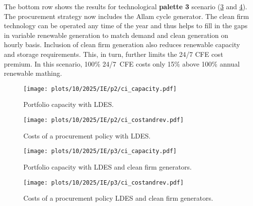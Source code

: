 The bottom row shows the results for technological \textbf{palette 3} scenario (\cref{fig:10-2025-IE-p3-ci_capacity} and \cref{fig:10-2025-IE-p3-ci_costandrev}). 
The procurement strategy now includes the Allam cycle generator.
The clean firm technology can be operated any time of the year and thus helps to fill in the gaps in variable renewable generation to match demand and clean generation on hourly basis.
Inclusion of clean firm generation also reduces renewable capacity and storage requirements. 
This, in turn, further limits the 24/7 CFE cost premium.
In this scenario, 100\% 24/7~CFE costs only 15\% above 100\% annual renewable mathing.

\begin{figure*}
    \centering
    \begin{subfigure}{0.5\textwidth}
        \centering
        \caption{Portfolio capacity with LDES.}
        \texttt{[image: plots/10/2025/IE/p2/ci\_capacity.pdf]}
        \label{fig:10-2025-IE-p2-ci_capacity}
    \end{subfigure}%
    \begin{subfigure}{0.5\textwidth}
        \centering
        \caption{Costs of a procurement policy with LDES.}
        \texttt{[image: plots/10/2025/IE/p2/ci\_costandrev.pdf]}
        \label{fig:10-2025-IE-p2-ci_costandrev}
    \end{subfigure}

    \begin{subfigure}{0.5\textwidth}
        \centering
        \vspace{-0.5cm}
        \caption{Portfolio capacity with LDES and clean firm generators.}
        \texttt{[image: plots/10/2025/IE/p3/ci\_capacity.pdf]}
        \label{fig:10-2025-IE-p3-ci_capacity}
    \end{subfigure}%
    \begin{subfigure}{0.5\textwidth}
        \centering
        \vspace{-0.5cm}
        \caption{Costs of a procurement policy LDES and clean firm generators.}
        \texttt{[image: plots/10/2025/IE/p3/ci\_costandrev.pdf]}
        \label{fig:10-2025-IE-p3-ci_costandrev}
    \end{subfigure}
    \caption{Procurement of clean resources and energy storage if \gls{ci} consumerts have an access to a wider palette of technologies. 
    The top row shows the power capacity portfolio (\cref{fig:10-2025-IE-p2-ci_capacity}) and the breakdown of costs (\cref{fig:10-2025-IE-p2-ci_costandrev}) 
    if \gls{ldes} is available on the market.
    The bottom row shows the power capacity portfolio (\cref{fig:10-2025-IE-p3-ci_capacity}) and the breakdown of costs (\cref{fig:10-2025-IE-p3-ci_costandrev}) 
    for a case when both \gls{ldes} and clean firm dispatchable generators are available.}
    \label{fig:10-2025-IE-p23-ci_procurement}
\end{figure*}


